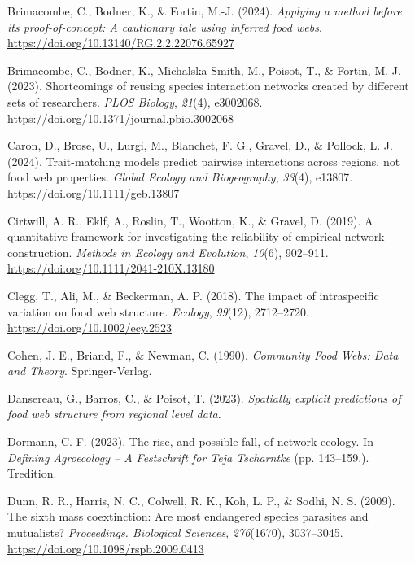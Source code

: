 \documentclass[
]{article}
\newlength{\cslhangindent}
\newenvironment{CSLReferences}[2] %
 {\begin{list}{}{%
  \setlength{\itemindent}{0pt}
  \setlength{\leftmargin}{0pt}
  \setlength{\parsep}{0pt}
  \ifodd #1
   \setlength{\leftmargin}{\cslhangindent}
   \setlength{\itemindent}{-1\cslhangindent}
  \fi
  \setlength{\itemsep}{#2\baselineskip}}}
 {\end{list}}
\begin{document}
\begin{CSLReferences}{1}{0}
Brimacombe, C., Bodner, K., \& Fortin, M.-J. (2024). \emph{Applying a
method before its proof-of-concept: {A} cautionary tale using inferred
food webs}. \url{https://doi.org/10.13140/RG.2.2.22076.65927}

Brimacombe, C., Bodner, K., Michalska-Smith, M., Poisot, T., \& Fortin,
M.-J. (2023). Shortcomings of reusing species interaction networks
created by different sets of researchers. \emph{PLOS Biology},
\emph{21}(4), e3002068.
\url{https://doi.org/10.1371/journal.pbio.3002068}

Caron, D., Brose, U., Lurgi, M., Blanchet, F. G., Gravel, D., \&
Pollock, L. J. (2024). Trait-matching models predict pairwise
interactions across regions, not food web properties. \emph{Global
Ecology and Biogeography}, \emph{33}(4), e13807.
\url{https://doi.org/10.1111/geb.13807}

Cirtwill, A. R., Eklf, A., Roslin, T., Wootton, K., \& Gravel, D.
(2019). A quantitative framework for investigating the reliability of
empirical network construction. \emph{Methods in Ecology and Evolution},
\emph{10}(6), 902--911. \url{https://doi.org/10.1111/2041-210X.13180}

Clegg, T., Ali, M., \& Beckerman, A. P. (2018). The impact of
intraspecific variation on food web structure. \emph{Ecology},
\emph{99}(12), 2712--2720. \url{https://doi.org/10.1002/ecy.2523}

Cohen, J. E., Briand, F., \& Newman, C. (1990). \emph{Community {Food
Webs}: {Data} and {Theory}}. Springer-Verlag.

Dansereau, G., Barros, C., \& Poisot, T. (2023). \emph{Spatially
explicit predictions of food web structure from regional level data}.

Dormann, C. F. (2023). The rise, and possible fall, of network ecology.
In \emph{Defining {Agroecology} -- {A Festschrift} for {Teja
Tscharntke}} (pp. 143--159.). Tredition.

Dunn, R. R., Harris, N. C., Colwell, R. K., Koh, L. P., \& Sodhi, N. S.
(2009). The sixth mass coextinction: Are most endangered species
parasites and mutualists? \emph{Proceedings. Biological Sciences},
\emph{276}(1670), 3037--3045.
\url{https://doi.org/10.1098/rspb.2009.0413}


\end{CSLReferences}
\end{document}

